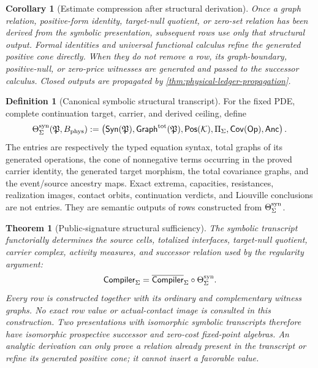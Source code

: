 \documentclass[11pt]{article}
\numberwithin{section}{part}
\theoremstyle{plain}
\newtheorem{theorem}{Theorem}[section]
\newtheorem{corollary}[corollary]{Corollary}
\theoremstyle{definition}
\newtheorem{definition}[definition]{Definition}
\theoremstyle{remark}
\newcommand{\Phys}{\mathrm{phys}}
\newcommand{\Budget}{B_{\Phys}}
\begin{document}
\begin{corollary}[Estimate compression after structural derivation]
\label{cor:estimate-replacement-invariant-evaluation}
Once a graph relation, positive-form identity, target-null quotient, or
zero-set relation has been derived from the symbolic presentation, subsequent
rows use only that structural output.  Formal identities and universal
functional calculus refine the generated positive cone directly.  When they
do not remove a row, its graph-boundary, positive-null, or zero-price witnesses
are generated and passed to the successor calculus.
Closed outputs are propagated by \cref{thm:physical-ledger-propagation}.
\end{corollary}

\begin{definition}[Canonical symbolic structural transcript]
\label{def:canonical-structural-transcript}
For the fixed PDE, complete continuation target, carrier, and derived ceiling,
define
\begin{equation}
 \label{eq:canonical-structural-transcript}
 \Theta_\Sigma^{\rm syn}(\mathfrak P,\Budget)
 :=\left(
   \mathsf{Syn}(\mathfrak P),
   \mathsf{Graph}^{\rm tot}(\mathfrak P),
   \mathsf{Pos}(\mathcal K),
   \Pi_\Sigma,
   \mathsf{Cov}(\mathsf{Op}),
   \mathsf{Anc}
 \right).
\end{equation}
The entries are respectively the typed equation syntax, total graphs of its
generated operations, the cone of nonnegative terms occurring in the proved
carrier identity, the generated target morphism, the total covariance graphs,
and the event/source ancestry maps.  Exact extrema, capacities, resistances,
realization images, contact orbits, continuation verdicts, and Liouville
conclusions are not entries.  They are semantic outputs of rows constructed
from \(\Theta_\Sigma^{\rm syn}\).
\end{definition}

\begin{theorem}[Public-signature structural sufficiency]
\label{thm:estimate-erasure}
The symbolic transcript functorially determines the source cells, totalized
interfaces, target-null quotient, carrier complex, activity measures, and
successor relation used by the regularity argument:
\begin{equation}
 \label{eq:estimate-erasure-factorization}
 \mathsf{Compiler}_\Sigma
 =\overline{\mathsf{Compiler}}_\Sigma
   \circ\Theta_\Sigma^{\rm syn}.
\end{equation}
Every row is constructed together with its ordinary and complementary witness
graphs.  No exact row value or actual-contact image is consulted in this
construction.  Two presentations with isomorphic symbolic transcripts
therefore have isomorphic prospective successor and zero-cost fixed-point
algebras.  An analytic derivation can only prove a relation already present in
the transcript or refine its generated positive cone; it cannot insert a
favorable value.
\end{theorem}
\end{document}
